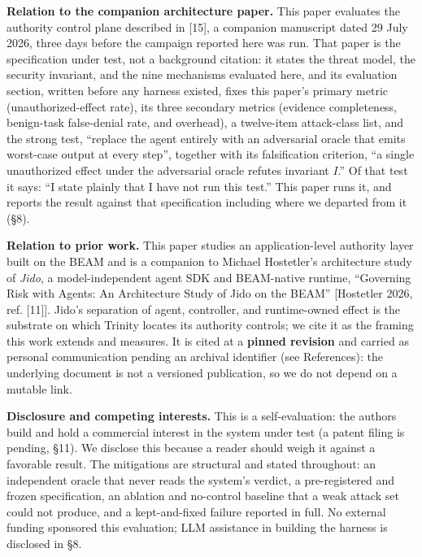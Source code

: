 \documentclass[11pt]{article}
\begin{document}
\textbf{Relation to the companion architecture paper.} This paper evaluates the authority control
plane described in {[}15{]}, a companion manuscript dated 29 July 2026, three days before the
campaign reported here was run. That paper is the specification under test, not a background
citation: it states the threat model, the security invariant, and the nine mechanisms evaluated
here, and its evaluation section, written before any harness existed, fixes this paper's primary
metric (unauthorized-effect rate), its three secondary metrics (evidence completeness,
benign-task false-denial rate, and overhead), a twelve-item attack-class list, and the strong test, ``replace the agent entirely with an adversarial oracle that emits worst-case output at every
step'', together with its falsification criterion, ``a single unauthorized effect under the
adversarial oracle refutes invariant $I$.'' Of that test it says: ``I state plainly that I have not
run this test.'' This paper runs it, and reports the result against that specification including
where we departed from it (\S8).

\textbf{Relation to prior work.} This paper studies an application-level authority layer built
on the BEAM and is a companion to Michael Hostetler's architecture study of \emph{Jido}, a
model-independent agent SDK and BEAM-native runtime, ``Governing Risk with Agents: An
Architecture Study of Jido on the BEAM'' {[}Hostetler 2026, ref. {[}11{]}{]}. Jido's separation of
agent, controller, and runtime-owned effect is the substrate on which Trinity locates its
authority controls; we cite it as the framing this work extends and measures. It is cited at
a \textbf{pinned revision} and carried as personal communication pending an archival identifier
(see References): the underlying document is not a versioned publication, so we do not
depend on a mutable link.

\textbf{Disclosure and competing interests.} This is a self-evaluation: the authors build and hold
a commercial interest in the system under test (a patent filing is pending, \S11). We disclose
this because a reader should weigh it against a favorable result. The mitigations are
structural and stated throughout: an independent oracle that never reads the system's verdict,
a pre-registered and frozen specification, an ablation and no-control baseline that a weak
attack set could not produce, and a kept-and-fixed failure reported in full. No external
funding sponsored this evaluation; LLM assistance in building the harness is disclosed in \S8.
\end{document}
